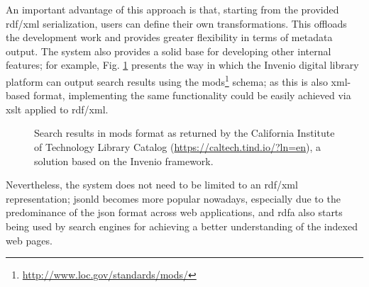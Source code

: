 An important advantage of this approach is that, starting from the provided \gls{rdf}/\gls{xml} serialization, users can define their own transformations. This offloads the development work and provides greater flexibility in terms of metadata output. The system also provides a solid
base for developing other internal features; for example, Fig. \ref{fig:tind_search} presents the way in which the Invenio digital library platform can output search results using the \gls{mods}\footnote{\url{http://www.loc.gov/standards/mods/}} schema; as this is also \gls{xml}-based format, implementing the same functionality could be easily achieved via \gls{xslt} applied to \gls{rdf}/\gls{xml}.

\begin{figure}[t]
  \centering
  \caption{Search results in \gls{mods} format as returned by the California Institute of Technology Library Catalog (\url{https://caltech.tind.io/?ln=en}), a solution based on the Invenio framework.}
  \label{fig:tind_search}
\end{figure}

Nevertheless, the system does not need to be limited to an \gls{rdf}/\gls{xml} representation; \gls{jsonld} becomes more popular nowadays, especially due to the predominance of the \gls{json} format across web applications, and \gls{rdfa} also starts being used by search engines for achieving a better understanding of the indexed web pages\cite{googleld}.

